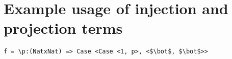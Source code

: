 \documentclass[12pt,a4paper]{report}
\theoremstyle{definition}
\theoremstyle{remark}
\begin{document}
%

\chapter{Example usage of injection and projection terms}

\begin{lstlisting}[mathescape, caption={Interpreter logs from applying injection and projection terms. The upper bound on values n = 2, effectively representing the booleans.}]
f = \p:(NatxNat) => Case <Case <1, p>, <$\bot$, $\bot$>>


\end{lstlisting}
\end{document}

